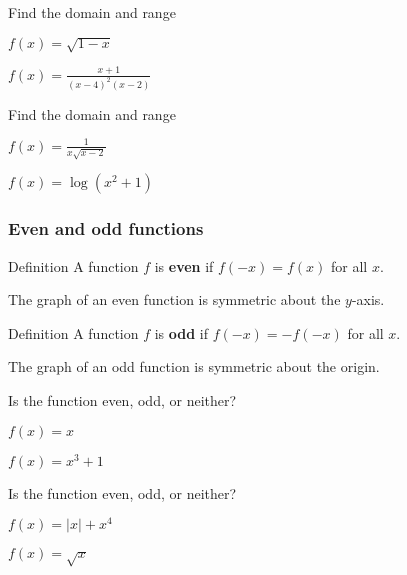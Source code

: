 \documentclass[t]{beamer}
\newenvironment{fpi}
  {\itemize[nolistsep,itemsep=\fill]}
  {\vfill\enditemize}
\begin{document}
\begin{frame}{Find the domain and range}
\begin{fpi}
\item $\displaystyle f(x) = \sqrt{1 - x}$
\item $\displaystyle f(x) = \frac{x+1}{(x-4)^2 (x-2)}$
\end{fpi}
\end{frame}

\begin{frame}{Find the domain and range}
\begin{fpi}
\item $\displaystyle f(x) = \frac{1}{x\sqrt{x-2}}$
\item $\displaystyle f(x) = \log(x^2 + 1)$
\end{fpi}
\end{frame}


\begin{frame}
\frametitle{Even and odd functions}
\begin{block}{Definition}
A function $f$ is \textbf{even} if $f(-x) = f(x)$ for all $x$.
\end{block}
The graph of an even function is symmetric about the $y$-axis.
\begin{block}{Definition}
A function $f$ is \textbf{odd} if $f(-x) = -f(-x)$ for all $x$.
\end{block}
The graph of an odd function is symmetric about the origin.
\end{frame}

\begin{frame}{Is the function even, odd, or neither?}
\begin{fpi}
\item $\displaystyle f(x) = x$
\item $\displaystyle f(x) = x^3 + 1$
\end{fpi}
\end{frame}

\begin{frame}{Is the function even, odd, or neither?}
\begin{fpi}
\item $\displaystyle f(x) = |x| + x^4$
\item $\displaystyle f(x) = \sqrt{x}$
\end{fpi}
\end{frame}
\end{document}
